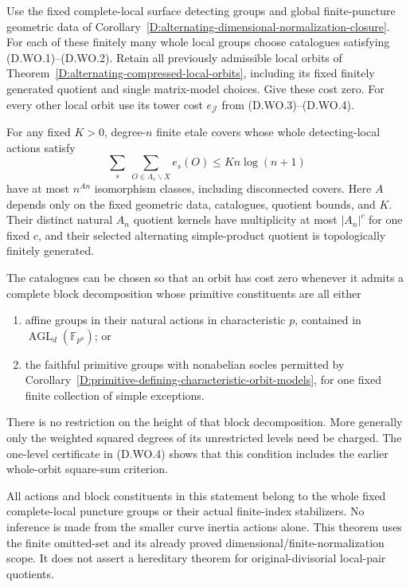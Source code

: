 \begin{theorem}
\label{D:alternating-local-wreath-energy}
Use the fixed complete-local surface detecting groups and
global finite-puncture geometric data of
Corollary~\ref{D:alternating-dimensional-normalization-closure}.
For each of these finitely many whole local groups choose
catalogues satisfying (D.WO.1)--(D.WO.2). Retain all
previously admissible local orbits of
Theorem~\ref{D:alternating-compressed-local-orbits},
including its fixed finitely generated quotient and
single matrix-model choices. Give these cost zero.
For every other local orbit use its tower cost
$e_{\mathcal J}$ from (D.WO.3)--(D.WO.4).

For any fixed $K>0$, degree-$n$ finite etale covers whose
whole detecting-local actions satisfy
\[
       \sum_{s}\ \sum_{O\in\Lambda_s\backslash X}
                         e_s(O)\le K n\log(n+1)        \tag{D.WO.12}
\]
have at most $n^{An}$ isomorphism classes, including
disconnected covers. Here $A$ depends only on the fixed
geometric data, catalogues, quotient bounds, and $K$.
Their distinct natural $A_n$ quotient kernels have
multiplicity at most $|A_n|^c$ for one fixed $c$, and
their selected alternating simple-product quotient is
topologically finitely generated.

The catalogues can be chosen so that an orbit has cost
zero whenever it admits a complete block decomposition
whose primitive constituents are all either
\begin{enumerate}
\item affine groups in their natural actions in
      characteristic $p$, contained in
      $\operatorname{AGL}_d(\mathbb F_{p^a})$; or
\item the faithful primitive groups with nonabelian
      socles permitted by
      Corollary~\ref{D:primitive-defining-characteristic-orbit-models},
      for one fixed finite collection of simple exceptions.
\end{enumerate}
There is no restriction on the height of that block
decomposition. More generally only the weighted squared
degrees of its unrestricted levels need be charged.
The one-level certificate in (D.WO.4) shows that this
condition includes the earlier whole-orbit square-sum
criterion.

All actions and block constituents in this statement
belong to the whole fixed complete-local puncture groups
or their actual finite-index stabilizers. No inference
is made from the smaller curve inertia actions alone.
This theorem uses the finite omitted-set and its already
proved dimensional/finite-normalization scope. It does
not assert a hereditary theorem for original-divisorial
local-pair quotients.
\end{theorem}

